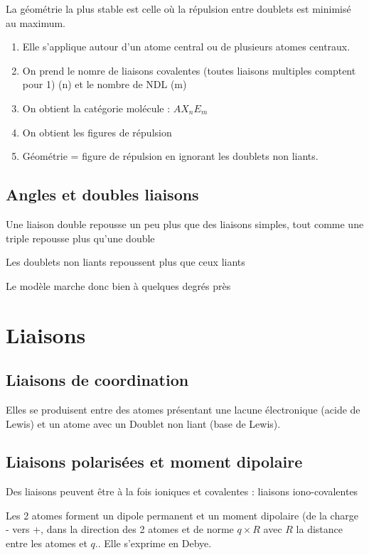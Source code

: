 \documentclass[french]{yLectureNote}
\begin{document}
La géométrie la plus stable est celle où la répulsion entre doublets est minimisé au maximum.
\begin{enumerate}
 \item Elle s'applique autour d'un atome central ou de plusieurs atomes centraux.
\item On prend le nomre de liaisons covalentes (toutes liaisons multiples comptent pour 1) (n) et le nombre de NDL (m)
\item On obtient la catégorie molécule : $AX_nE_m$
\item On obtient les figures de répulsion
\item Géométrie = figure de répulsion en ignorant les doublets non liants.
\end{enumerate}
\subsection{Angles et doubles liaisons}
Une liaison double repousse un peu plus que des liaisons simples, tout comme une triple repousse plus qu'une double

Les doublets non liants repoussent plus que ceux liants

Le modèle marche donc bien à quelques degrés près


\section{Liaisons}
\subsection{Liaisons de coordination}
Elles se produisent entre des atomes présentant une lacune électronique (acide de Lewis) et un atome avec un Doublet non liant (base de Lewis).
\subsection{Liaisons polarisées et moment dipolaire}
Des liaisons peuvent \^etre à la fois ioniques et covalentes : liaisons iono-covalentes

Les 2 atomes forment un dipole permanent et un moment dipolaire (de la charge - vers +, dans la direction des 2 atomes et de norme $q\times R$ avec $R$ la distance entre les atomes et $q$.. Elle s'exprime en Debye.
\end{document}
